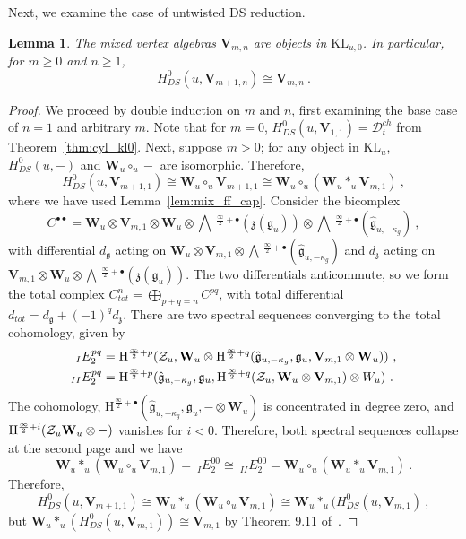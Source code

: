 \documentclass[a4paper]{article}
\newtheorem{lem}[thm]{Lemma}
\def\ZZ{{\cal Z}}
\def\gf{\mathfrak{g}}
\def \zf{\mathfrak{z}}
\def \KL{\mathrm{KL}}
\newcommand{\Hi}[1]{\mathrm{H}^{\frac{\infty}{2}+#1}}
\newcommand{\Li}[1]{\mathrm{\bigwedge}\,^{\frac{\infty}{2}+#1}}
\def\D{\mathcal{D}^{ch}}
\def\W{\mathbf{W}}
\def\V{\mathbf{V}}
\begin{document}
Next, we examine the case of untwisted DS reduction.
\begin{lem}\label{lem:mix_kl0}
The mixed vertex algebras $\V_{m,n}$ are objects in $\KL_{u,0}$. In particular, for $m\geqslant 0$ and $n\geqslant 1$,
\begin{equation*}
	H^0_{DS}(u, \V_{m+1,n}) \cong \V_{m,n}~.
\end{equation*}
\end{lem}
\begin{proof}
We proceed by double induction on $m$ and $n$, first examining the base case of $n=1$ and arbitrary $m$. Note that for $m=0$, $H^0_{DS}(u,\V_{1,1})=\D_t$ from Theorem~\ref{thm:cyl_kl0}. Next, suppose $m>0$; for any object in $\KL_u$, $H^0_{DS}(u,-)$ and $\W_u\circ_u-$ are isomorphic. Therefore,
\begin{equation*}
	H^0_{DS} (u,\V_{m+1,1}) \cong \W_u\circ_u \V_{m+1,1}\cong \W_u \circ_u(\W_u\ast_u \V_{m,1})~,
\end{equation*}
where we have used Lemma~\ref{lem:mix_ff_cap}. Consider the bicomplex
\begin{equation*}
	C^{\bullet \bullet} =\W_u\otimes \V_{m,1}\otimes \W_u \otimes \Li{\bullet}(\zf(\gf_u))\otimes \Li{\bullet}(\hat{\gf}_{u,-\kappa_g})~,
\end{equation*}
with differential $d_\gf$ acting on $\W_u\otimes \V_{m,1} \otimes \Li{\bullet}(\hat{\gf}_{u,-\kappa_g})$ and $d_\zf$ acting on $\V_{m,1}\otimes \W_u \otimes \Li{\bullet}(\zf(\gf_u))$. The two differentials anticommute, so we form the total complex $C^n_{tot}=\bigoplus_{p+q=n} C^{pq}$, with total differential $d_{tot} = d_{\gf} + (-1)^q d_\zf$. There are two spectral sequences converging to the total cohomology, given by
\begin{equation}\nonumber
	\begin{split}
	_{I} E^{pq}_2 &= \Hi{p}(\ZZ_u,\W_u\otimes \Hi{q}(\hat{\gf}_{u,-\kappa_g},\gf_u, \V_{m,1}\otimes \W_u))~,\\
	_{II} E^{pq}_2 &= \Hi{p}(\hat{\gf}_{u,-\kappa_g},\gf_u ,\Hi{q}(\ZZ_u,\W_u\otimes \V_{m,1})\otimes W_u)~.
	\end{split}
\end{equation}
The cohomology, $\Hi{\bullet}(\hat{\gf}_{u,-\kappa_g},\gf_u,-\otimes \W_u)$ is concentrated in degree zero, and $\Hi{i}(\ZZ_u \W_u\otimes -)$ vanishes for $i<0$. Therefore, both spectral sequences collapse at the second page and we have
\begin{equation}\nonumber
	\W_u\ast_u(\W_u\circ_u \V_{m,1})=\ _{I} E^{00}_2\cong\ _{II} E^{00}_2 =\W_u\circ_u(\W_u\ast_u \V_{m,1})~.
\end{equation}
Therefore,
\begin{equation*}
	H^0_{DS}(u,\V_{m+1,1}) \cong \W_u\ast_u (\W_u\circ_u\V_{m,1})\cong \W_u \ast_u (H^0_{DS}(u,\V_{m,1})~,
\end{equation*}
but $\W_u\ast_u(H^0_{DS}(u,\V_{m,1}))\cong \V_{m,1}$ by Theorem 9.11 of~\cite{Arakawa:2018egx}.


\end{proof}
\end{document}
